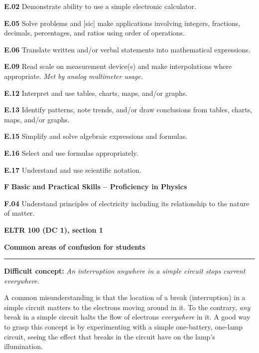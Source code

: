 \item{\bf E.02} Demonstrate ability to use a simple electronic calculator.
\item{\bf E.05} Solve problems and [sic] make applications involving integers, fractions, decimals, percentages, and ratios using order of operations.
\item{\bf E.06} Translate written and/or verbal statements into mathematical expressions.
\item{\bf E.09} Read scale on measurement device(s) and make interpolations where appropriate.  {\it Met by analog multimeter usage.}
\item{\bf E.12} Interpret and use tables, charts, maps, and/or graphs.
\item{\bf E.13} Identify patterns, note trends, and/or draw conclusions from tables, charts, maps, and/or graphs.
\item{\bf E.15} Simplify and solve algebraic expressions and formulas.
\item{\bf E.16} Select and use formulas appropriately.
\item{\bf E.17} Understand and use scientific notation.
\item{\bf F} {\bf Basic and Practical Skills -- Proficiency in Physics}
\item{\bf F.04} Understand principles of electricity including its relationship to the nature of matter.
\medskip

\vskip 10pt





\vfil \eject

\centerline{\bf ELTR 100 (DC 1), section 1} \bigskip 
 
\vskip 10pt

\noindent
{\bf Common areas of confusion for students}

\vskip 5pt

\hrule \vskip 5pt

\vskip 10pt

\noindent
{\bf Difficult concept: } {\it An interruption anywhere in a simple circuit stops current everywhere.}

A common misunderstanding is that the location of a break (interruption) in a simple circuit matters to the electrons moving around in it.  To the contrary, {\it any} break in a simple circuit halts the flow of electrons {\it everywhere} in it.  A good way to grasp this concept is by experimenting with a simple one-battery, one-lamp circuit, seeing the effect that breaks in the circuit have on the lamp's illumination.

